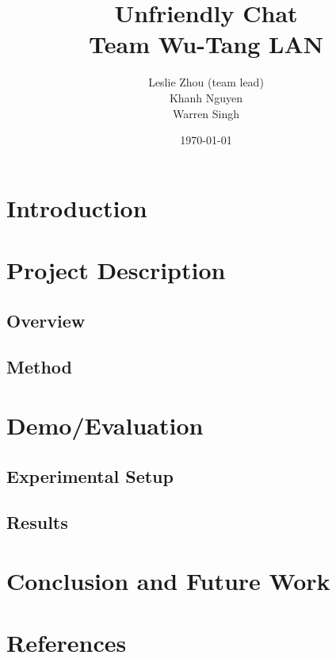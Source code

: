 \documentclass[12pt]{article}
\title{%
    Unfriendly Chat\\
    \large Team Wu-Tang LAN}
\author{Leslie Zhou (team lead)\\ Khanh Nguyen \\ Warren Singh}
\date{\today}
\begin{document}
\maketitle

\newpage
\tableofcontents
\newpage

\section{Introduction}
\par %
\par %
\par %
\par%

\newpage
\section{Project Description}

\subsection{Overview}
\par 

\newpage
\subsection{Method}


\newpage
\section{Demo/Evaluation}
\subsection{Experimental Setup}

\subsection{Results}


\section{Conclusion and Future Work}






\newpage
\section{References}
\printbibliography
\end{document}
